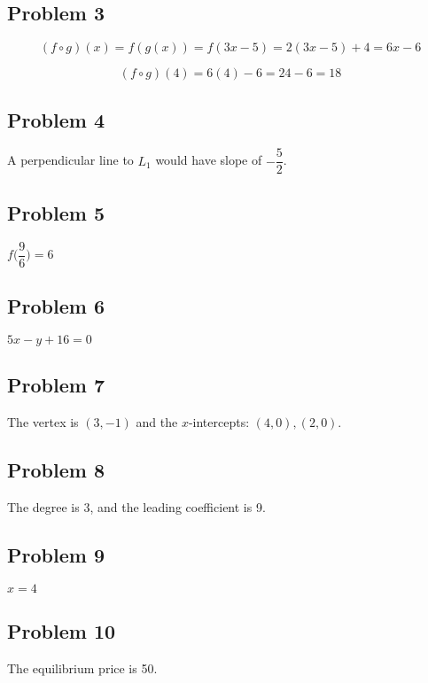 \documentclass[12pt]{article}
\begin{document}
\subsection*{Problem 3}
\[
(f \circ g)(x) = f(g(x)) = f(3x - 5) = 2(3x - 5) + 4 = 6x - 6
\]

\[
(f \circ g)(4) = 6(4) - 6 = 24 - 6 = \boxed{18}
\]

\subsection*{Problem 4}
A perpendicular line to \(L_1\) would have slope of \(-\dfrac{5}{2}\).
\subsection*{Problem 5}
\(f\Big(\dfrac{9}{6}\Big)=6\)
\subsection*{Problem 6}
\(5x-y+16=0\)
\subsection*{Problem 7}
The vertex is \((3,-1)\) and the \(x\)-intercepts: \((4,0),(2,0)\).
\subsection*{Problem 8}
The degree is 3, and the leading coefficient is 9.
\subsection*{Problem 9}
\(x=4\)
\subsection*{Problem 10}
The equilibrium price is 50.
\end{document}
